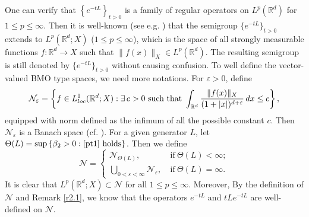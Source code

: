 \documentclass[oneside,english,a4wide]{amsart}
\numberwithin{equation}{section}
\numberwithin{figure}{section}
\theoremstyle{plain}
\theoremstyle{plain}
\theoremstyle{definition}
\theoremstyle{plain}
\theoremstyle{remark}
\theoremstyle{definition}
\theoremstyle{remark}
\theoremstyle{definition}
\newcommand{\real}{{\mathbb R}}
\newcommand{\N}{{\mathcal N}}
\newcommand{\e}{\varepsilon}
\newcommand{\8}{+\infty}
\renewcommand{\1}{\mathbbm{1}}
\newcommand\jdz[1]{ \left| #1 \right| }
\newcommand\sk[1]{ \left( #1 \right) }
\newcommand\mk[1]{ \left[ #1 \right] }
\newcommand\lk[1]{ \left\{ #1 \right\} }
\renewcommand\d{{\rm d}}
\begin{document}

One can verify that $\lk{e^{-tL}}_{t > 0}$ is a family of regular operators on $L^p(\real^d)$ for $1 \leq p \leq \infty$. Then it is well-known (see e.g. \cite{Xu2021}) that the semigroup $\{e^{-tL}\}_{t>0}$ extends to $L^p(\real^d; X)$ ($1\leq p \leq \infty$), which is the space of all strongly measurable functions $f: \real^d \to X$ such that $\|f(x)\|_X \in L^p(\real^d)$. The resulting semigroup is still denoted by $\{e^{-tL}\}_{t>0}$ without causing confusion. To well define the vector-valued BMO type spaces, we need more notations. For $\e > 0$, define
\[
    \N_\e = \lk{ f\in L^1_{{\rm loc}}(\real^d; X) : \exists\, c > 0 \text{ such that } \int_{\real^d} \frac{ \|f(x)\|_X }{(1 + |x|)^{d + \e}} \,\d x\leq c },
\]
equipped with norm defined as the infimum of all the possible constant $c$. Then $\N_\e$ is a Banach space (cf. \cite{DXT}). For a given generator $L$, let $\Theta(L) = \sup\lk{ \beta_2 > 0 : \eqref{pt1} \text{ holds} } $. Then we define
\[
    \N=\begin{cases}
        \N_{\Theta(L)}, & \ \mathrm{if}\ \Theta(L) < \infty ;\\
        \bigcup_{0 < \e < \infty} \N_\e, & \ \mathrm{if}\ \Theta(L) = \infty.
    \end{cases}  
\] 
It is clear that $L^p(\real^d;X) \subset \N$ for all $1 \leq p \leq \infty$. Moreover, 
By the definition of $\N$ and Remark \ref{r2.1}, we know that the operators $e^{-tL}$ and $tLe^{-tL}$ are well-defined on $\N$.
\end{document}
